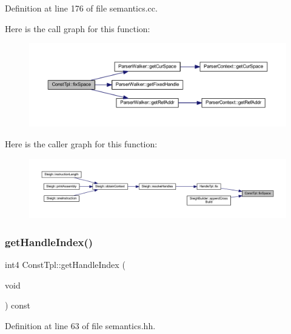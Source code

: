 Definition at line 176 of file semantics.\+cc.

Here is the call graph for this function\+:
\nopagebreak
\begin{figure}[H]
\begin{center}
\leavevmode
\includegraphics[width=350pt]{class_const_tpl_ab27ba4441dc79c4dd00dbd41d75d3e90_cgraph}
\end{center}
\end{figure}
Here is the caller graph for this function\+:
\nopagebreak
\begin{figure}[H]
\begin{center}
\leavevmode
\includegraphics[width=350pt]{class_const_tpl_ab27ba4441dc79c4dd00dbd41d75d3e90_icgraph}
\end{center}
\end{figure}
\mbox{\label{class_const_tpl_ae13b49fd91f96382b97c7b0d6901653f}} 
\subsubsection{\texorpdfstring{getHandleIndex()}{getHandleIndex()}}
{\footnotesize\ttfamily int4 Const\+Tpl\+::get\+Handle\+Index (\begin{DoxyParamCaption}\item[{void}]{ }\end{DoxyParamCaption}) const\hspace{0.3cm}{\ttfamily [inline]}}



Definition at line 63 of file semantics.\+hh.

